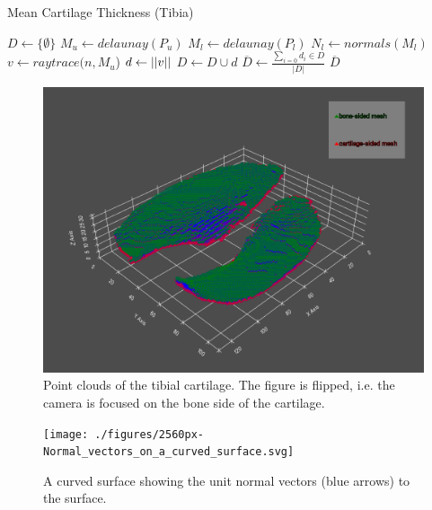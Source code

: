 \begin{algorithm}
	\caption{Mean Cartilage Thickness (Tibia)}
	\label{algo:tibialthickness}
	\begin{algorithmic}[1]
		\State $D \gets \{\emptyset\}$
		\State $M_{u} \gets delaunay(P_{u})$
		\State $M_{l} \gets delaunay(P_{l})$
		\State $N_{l} \gets normals(M_{l})$
			\State $v \gets raytrace(n, M_{u}$)
			\State $d \gets \lvert \lvert v \rvert \rvert$
			\State $D \gets D \cup d$
		\EndFor
		\State $\overline{D} \gets \frac{\sum_{i = 0} d_{i} \in D}{\lvert D \rvert}$
		\State
		\Return $\overline{D}$
		\EndProcedure
	\end{algorithmic}
\end{algorithm}
\begin{figure}[htb!]
	\centering
	\includegraphics[width=\linewidth]{./figures/tibial_points}
	\caption{Point clouds of the tibial cartilage. The figure is flipped, i.e. the camera is focused on the bone side of the cartilage.}
	\label{fig:tibial_point_cloud}
\end{figure}
\begin{figure}[htb!]
	\centering
	\texttt{[image: ./figures/2560px-Normal\_vectors\_on\_a\_curved\_surface.svg]}
	\caption{A curved surface showing the unit normal vectors (blue arrows) to the surface. \cite{surfacenormals}}
	\label{fig:surfacenormals}
\end{figure}
\par
